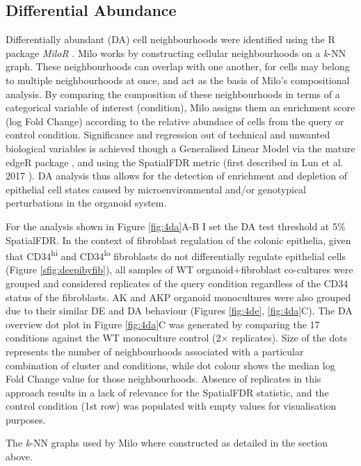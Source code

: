 \subsection{Differential Abundance}

Differentially abundant (DA) cell neighbourhoods were identified using the R package \textit{MiloR} \cite{dann_differential_2022}. Milo works by constructing cellular neighbourhoods on a \emph{k}-NN graph. These neighbourhoods can overlap with one another, for cells may belong to multiple neighbourhoods at once, and act as the basis of Milo's compositional analysis. By comparing the composition of these neighbourhoods in terms of a categorical variable of interest (condition), Milo assigns them an enrichment score (log Fold Change) according to the relative abundace of cells from the query or control condition. Significance and regression out of technical and unwanted biological variables is achieved though a Generalised Linear Model via the mature edgeR package \cite{robinson_edger_2010}, and using the SpatialFDR metric (first described in Lun et al. 2017 \cite{lun_testing_2017}).
DA analysis thus allows for the detection of enrichment and depletion of epithelial cell states caused by microenvironmental and/or genotypical perturbations in the organoid system. 

For the analysis shown in Figure \ref{fig:4da}A-B I set the DA test threshold at 5\% SpatialFDR. In the context of fibroblast regulation of the colonic epithelia, given that CD34\textsuperscript{hi} and CD34\textsuperscript{lo} fibroblasts do not differentially regulate epithelial cells (Figure \ref{sfig:deepibyfib}), all samples of WT organoid+fibroblast co-cultures were grouped and considered replicates of the query condition regardless of the CD34 status of the fibroblasts. AK and AKP organoid monocultures were also grouped due to their similar DE and DA behaviour (Figures \ref{fig:4de}, \ref{fig:4da}C).
The DA overview dot plot in Figure \ref{fig:4da}C was generated by comparing the 17 conditions against the WT monoculture control (2$\times$ replicates). Size of the dots represents the number of neighbourhoods associated with a particular combination of cluster and conditions, while dot colour shows the median log Fold Change value for those neighbourhoods. Absence of replicates in this approach results in a lack of relevance for the SpatialFDR statistic, and the control condition (1st row) was populated with empty values for visualisation purposes. 

The \emph{k}-NN graphs used by Milo where constructed as detailed in the section above.

